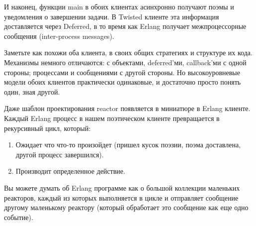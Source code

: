 И наконец, функции main в обоих клиентах асинхронно получают 
поэмы и уведомления о завершении задачи. В Twisted клиенте эта информация 
доставляется через Deferred, в то время как Erlang получает межпроцессорные 
сообщения (inter-process messages).
 

Заметьте как похожи оба клиента, в своих общих стратегиях и 
структуре их кода. Механизмы немного отличаются: 
с объектами, deferred'ми, callback'ми с одной стороны; 
процессами и сообщениями с другой стороны. Но высокоуровневые 
модели обоих клиентов практически одинаковые, и достаточно 
просто понять один, зная другой.


Даже шаблон проектирования reactor появляется в миниатюре в Erlang клиенте. 
Каждый Erlang процесс в нашем поэтическом клиенте превращается в 
рекурсивный цикл, который:

\begin{enumerate}

\item Ожидает что что-то произойдет (пришел кусок поэзии, поэма доставлена, 
другой процесс завершился).

\item Производит определенное действие.

\end{enumerate}


Вы можете думать об Erlang программе как о большой коллекции маленьких 
реакторов, каждый из которых выполняется в цикле и отправляет сообщение 
другому маленькому реактору (который обработает это сообщение как еще одно событие).


